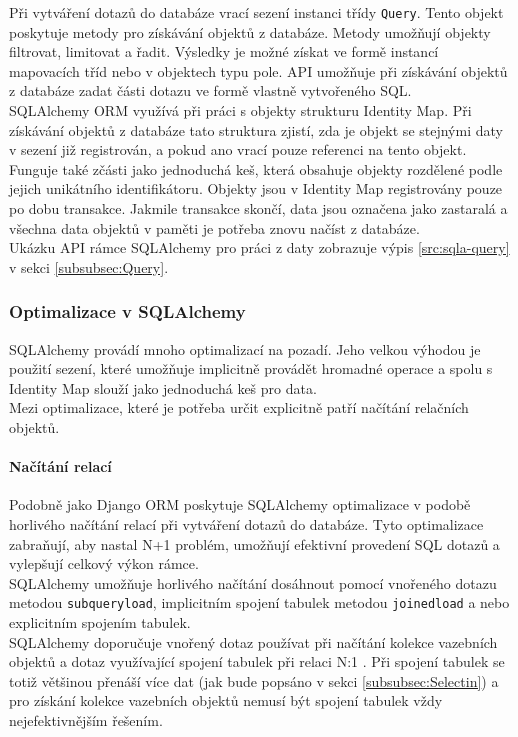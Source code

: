 \documentclass[ing,male,java,dept456]{diploma}						%
\begin{document}
Při vytváření dotazů do databáze vrací sezení instanci třídy \lstinline[style=inlinepython]|Query|. Tento objekt poskytuje metody pro získávání objektů z databáze. Metody umožňují objekty filtrovat, limitovat a řadit. Výsledky je možné získat ve formě instancí mapovacích tříd nebo v objektech typu pole. API umožňuje při získávání objektů z databáze zadat části dotazu ve formě vlastně vytvořeného SQL. \\
SQLAlchemy ORM využívá při práci s objekty strukturu Identity Map. Při získávání objektů z databáze tato struktura zjistí, zda je objekt se stejnými daty v sezení již registrován, a pokud ano vrací pouze referenci na tento objekt. Funguje také zčásti jako jednoduchá keš, která obsahuje objekty rozdělené podle jejich unikátního identifikátoru. Objekty jsou v Identity Map registrovány pouze po dobu transakce. Jakmile transakce skončí, data jsou označena jako zastaralá a všechna data objektů v paměti je potřeba znovu načíst z databáze. \\
Ukázku API rámce SQLAlchemy pro práci z daty zobrazuje výpis \ref{src:sqla-query} v sekci \ref{subsubsec:Query}.

\subsubsection{Optimalizace v SQLAlchemy}
\label{subsubsec:sqla-opt}

SQLAlchemy provádí mnoho optimalizací na pozadí. Jeho velkou výhodou je použití sezení, které umožňuje implicitně provádět hromadné operace a spolu s Identity Map slouží jako jednoduchá keš pro data. \\
Mezi optimalizace, které je potřeba určit explicitně patří načítání relačních objektů.

\paragraph{Načítání relací}
Podobně jako Django ORM poskytuje SQLAlchemy optimalizace v podobě horlivého načítání relací při vytváření dotazů do databáze. Tyto optimalizace zabraňují, aby nastal N+1 problém, umožňují efektivní provedení SQL dotazů a vylepšují celkový výkon rámce. \\
SQLAlchemy umožňuje horlivého načítání dosáhnout pomocí vnořeného dotazu metodou \lstinline[style=inlinepython]|subqueryload|, implicitním spojení tabulek metodou \lstinline[style=inlinepython]|joinedload| a nebo explicitním spojením tabulek. \\
SQLAlchemy doporučuje vnořený dotaz používat při načítání kolekce vazebních objektů a dotaz využívající spojení tabulek při relaci N:1 \cite{sqla-doc}. Při spojení tabulek se totiž většinou přenáší více dat (jak bude popsáno v sekci \ref{subsubsec:Selectin}) a pro získání kolekce vazebních objektů nemusí být spojení tabulek vždy nejefektivnějším řešením.
\end{document}
